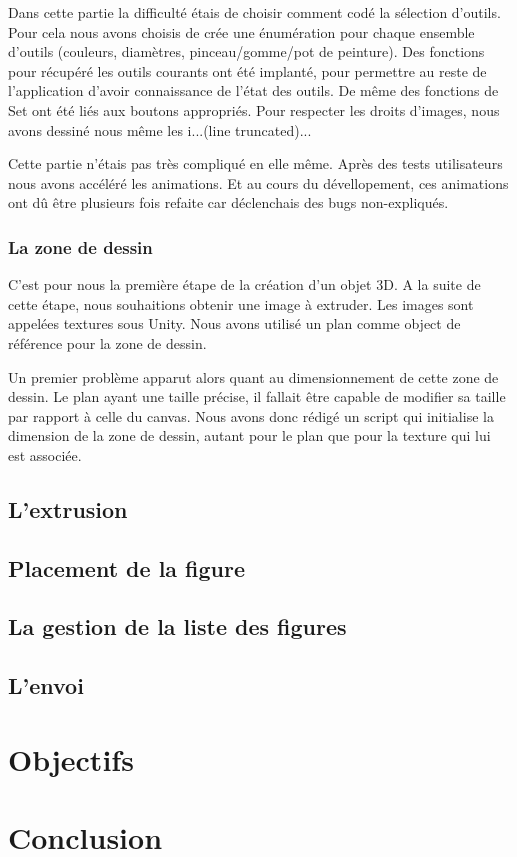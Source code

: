\documentclass[a4paper,11pt]{article}
\begin{document}
				Dans cette partie la difficulté étais de choisir comment codé la sélection d'outils. Pour cela nous avons choisis de crée une énumération pour chaque ensemble d'outils (couleurs, diamètres, pinceau/gomme/pot de peinture). Des fonctions pour récupéré les outils courants ont été implanté, pour permettre au reste de l'application d'avoir connaissance de l'état des outils. De même des fonctions de Set ont été liés aux boutons appropriés. Pour respecter les droits d'images, nous avons dessiné nous même les i...(line truncated)...
				
				Cette partie n'étais pas très compliqué en elle même. Après des tests utilisateurs nous avons accéléré les animations. Et au cours du dévellopement, ces animations ont dû être plusieurs fois refaite car déclenchais des bugs non-expliqués.
			\subsubsection{La zone de dessin}
			
			C'est pour nous la première étape de la création d'un objet 3D. A la suite de cette étape, nous souhaitions obtenir une image à extruder. Les images sont appelées textures sous Unity. Nous avons utilisé un plan comme object de référence pour la zone de dessin.
			
			Un premier problème apparut alors quant au dimensionnement de cette zone de dessin. Le plan ayant une taille précise, il fallait être capable de modifier sa taille par rapport à celle du canvas. Nous avons donc rédigé un script qui initialise la dimension de la zone de dessin, autant pour le plan que pour la texture qui lui est associée.
		\subsection{L'extrusion}
		\subsection{Placement de la figure}
		\subsection{La gestion de la liste des figures}
		\subsection{L'envoi}
	\section{Objectifs}
	\section{Conclusion}
	
\end{document}
